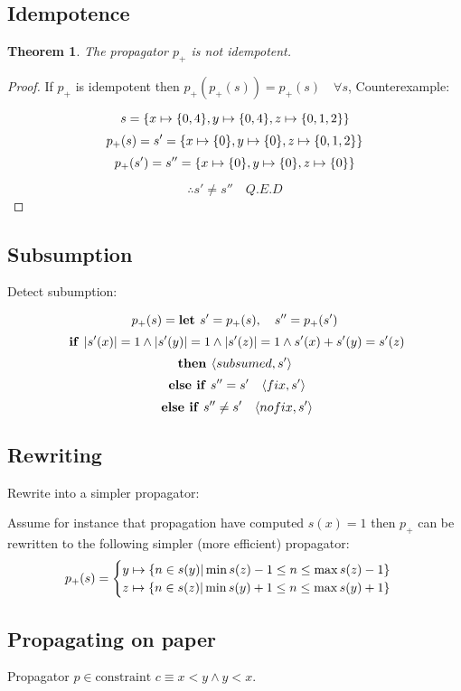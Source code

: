 \documentclass[a4paper, 11pt]{article}
\newtheorem{theorem}{Theorem}[section]
\newcommand\mymapsto{\mathrel{\ooalign{$\rightarrow$\cr%
  \kern-.15ex\raise.275ex\hbox{\scalebox{1}[0.522]{$\mid$}}\cr}}}
\begin{document}
\subsection*{Idempotence}
\begin{theorem}
The propagator $p_+$ is not idempotent.
\end{theorem}
\begin{proof}
If $p_+$ is idempotent then $p_+(p_+(s)) = p_+(s) \quad \forall s$, 
Counterexample:

$$s = \{x \mymapsto \{0,4\}, y \mymapsto \{0,4\}, z \mymapsto \{0,1,2\}\}$$
$$p_+(s) = s' = \{x \mymapsto \{0\}, y \mymapsto \{0\}, z \mymapsto \{0,1,2\}\}$$
$$p_+(s') = s'' = \{x \mymapsto \{0\}, y \mymapsto \{0\}, z \mymapsto \{0\}\}$$

$$\therefore s' \neq s'' \quad Q.E.D$$

\end{proof}
\subsection*{Subsumption}
Detect subumption:

$$p_+(s) = \text{\textbf{let }} s' = p_+(s),\quad s'' = p_+(s')$$
$$\text{ \textbf{if }} |s'(x)| = 1 \land |s'(y)| = 1 \land |s'(z)| = 1 \land s'(x) + s'(y) = s'(z)$$
$$\text{\textbf{then }} \langle subsumed, s'\rangle$$
$$\text{ \textbf{else if} } s'' = s' \quad \langle fix, s' \rangle$$
$$\text{ \textbf{else if} } s'' \neq s' \quad \langle nofix, s' \rangle$$

\subsection*{Rewriting}
Rewrite into a simpler propagator:

Assume for instance that propagation have computed $s(x) = {1}$ then $p_+$ can be rewritten to the following simpler (more efficient) propagator:
\begin{gather*}
p_+(s) = 
\begin{cases}
  y \mymapsto \{n \in s(y) | \min s(z) - 1 \leq n \leq \max s(z) - 1 \}\\
  z \mymapsto \{n \in s(z) | \min s(y) + 1 \leq n \leq \max s(y) + 1 \}\\    
\end{cases}
\end{gather*}


\subsection*{Propagating on paper}
Propagator $p \in \text{constraint } c \equiv x < y \land y < x$.
\end{document}
